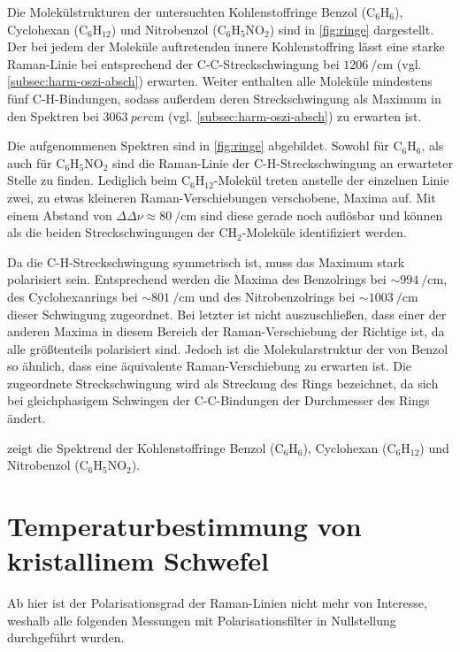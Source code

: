 \documentclass[../bericht.tex]{subfiles}
\begin{document}
      Die Molekülstrukturen der untersuchten Kohlenstoffringe Benzol ($\mathrm{C_6H_6}$), Cyclohexan ($\mathrm{C_6H_{12}}$) und Nitrobenzol ($\mathrm{C_6H_5NO_2}$) sind in \cref{fig:ringe} dargestellt. Der bei jedem der Moleküle auftretenden innere Kohlenstoffring lässt eine starke Raman-Linie bei entsprechend der C-C-Streckschwingung bei $\SI{1206}{\per\centi\meter}$ (vgl. \cref{subsec:harm-oszi-absch}) erwarten. Weiter enthalten alle Moleküle mindestens fünf C-H-Bindungen, sodass außerdem deren Streckschwingung als Maximum in den Spektren bei $\SI{3063}{per\centi\meter}$ (vgl. \cref{subsec:harm-oszi-absch}) zu erwarten ist.

      Die aufgenommenen Spektren sind in \cref{fig:ringe} abgebildet. Sowohl für $\mathrm{C_6H_6}$, als auch für $\mathrm{C_6H_5NO_2}$ sind die Raman-Linie der C-H-Streckschwingung an erwarteter Stelle zu finden. Lediglich beim $\mathrm{C_6H_{12}}$-Molekül treten anstelle der einzelnen Linie zwei, zu etwas kleineren Raman-Verschiebungen verschobene, Maxima auf. Mit einem Abstand von $\Delta \Delta \nu \approx \SI{80}{\per\centi\meter}$ sind diese gerade noch auflösbar und können als die beiden Streckschwingungen der $\mathrm{CH_2}$-Moleküle identifiziert werden.

      Da die C-H-Streckschwingung symmetrisch ist, muss das Maximum stark polarisiert sein. Entsprechend werden die Maxima des Benzolrings bei $\sim\SI{994}{\per\centi\meter}$, des Cyclohexanrings bei $\sim\SI{801}{\per\centi\meter}$ und des Nitrobenzolrings bei $\sim\SI{1003}{\per\centi\meter}$ dieser Schwingung zugeordnet. Bei letzter ist nicht auszuschließen, dass einer der anderen Maxima in diesem Bereich der Raman-Verschiebung der Richtige ist, da alle größtenteils polarisiert sind. Jedoch ist die Molekularstruktur der von Benzol so ähnlich, dass eine äquivalente Raman-Verschiebung zu erwarten ist. Die zugeordnete Streckschwingung wird als Streckung des Rings bezeichnet, da sich bei gleichphasigem Schwingen der C-C-Bindungen der Durchmesser des Rings ändert.

       zeigt die Spektrend der Kohlenstoffringe Benzol ($\mathrm{C_6H_6}$), Cyclohexan ($\mathrm{C_6H_{12}}$) und Nitrobenzol ($\mathrm{C_6H_5NO_2}$).


  \section{Temperaturbestimmung von kristallinem Schwefel}
  \label{sec:schwefel}

    Ab hier ist der Polarisationsgrad der Raman-Linien nicht mehr von Interesse, weshalb alle folgenden Messungen mit Polarisationsfilter in Nullstellung durchgeführt wurden.
\end{document}

